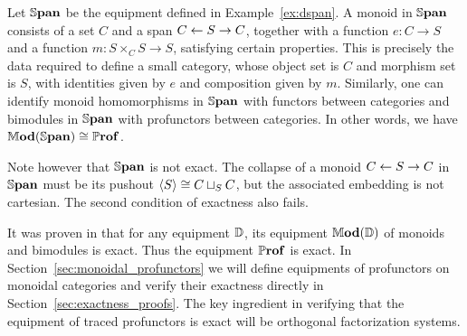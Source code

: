 \documentclass[11pt,oneside,article]{memoir}
\begin{document}
\begin{example}
      \label{ex:mod_span_prof}
   Let $\mathbb{S}\mathbf{pan}$ be the equipment defined in Example~\ref{ex:dspan}. A monoid in $\mathbb{S}\mathbf{pan}$ consists of
   a set $C$ and a span $C\leftarrow S\to C$, together with a function $e\colon C\to S$ and a function
   $m\colon S\times_C S\to S$, satisfying certain properties. This is precisely the data required to
   define a small category, whose object set is $C$ and morphism set is $S$, with identities given
   by $e$ and composition given by $m$. Similarly, one can identify monoid homomorphisms in $\mathbb{S}\mathbf{pan}$
   with functors between categories and bimodules in $\mathbb{S}\mathbf{pan}$ with profunctors between categories.
   In other words, we have $\mathbb{M}\mathbf{od}(\mathbb{S}\mathbf{pan})\cong\mathbb{P}\mathbf{rof}$.

   Note however that $\mathbb{S}\mathbf{pan}$ is not exact. The collapse of a monoid $C\leftarrow S\to C$ in $\mathbb{S}\mathbf{pan}$ must be its pushout $\langle S\rangle\cong C\sqcup_SC$, but the associated embedding is not cartesian. The second condition of exactness also fails.
\end{example}
\begin{remark}
  It was proven in \cite[Proposition~5.2]{Schultz2015} that for any equipment $\mathbb{D}$, its equipment $\mathbb{M}\mathbf{od}(\mathbb{D})$ of monoids and bimodules is exact. Thus the equipment $\mathbb{P}\mathbf{rof}$ is exact. In Section~\ref{sec:monoidal_profunctors} we will define equipments of profunctors on monoidal categories and verify their exactness directly in Section~\ref{sec:exactness_proofs}. The key ingredient in verifying that the equipment of traced profunctors is exact will be orthogonal factorization systems.
\end{remark}
\end{document}
